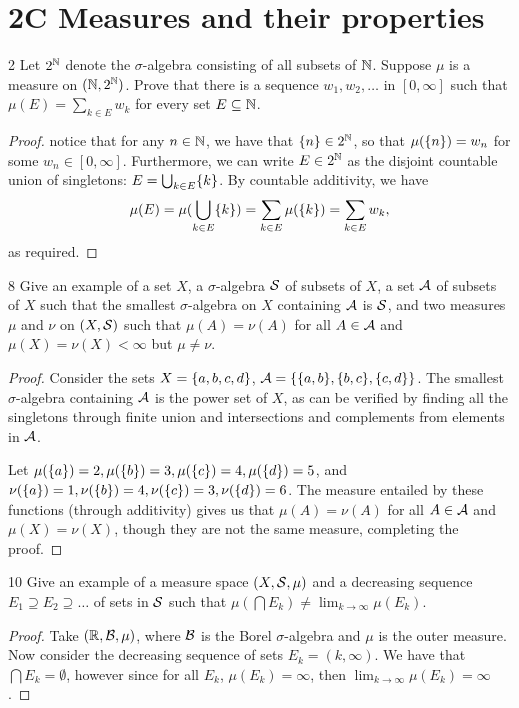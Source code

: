\section{2C Measures and their properties}


\begin{exercise}{2}
Let $2^{\mathbb{N}}$ denote the $\sigma$-algebra consisting of all subsets of $\mathbb{N}$.
Suppose $\mu$ is a measure on $(\mathbb{N}, 2^{\mathbb{N}})$.
Prove that there is a sequence $w_1,w_2,\dots$ in $[0,\infty]$ such that $\mu(E) = \sum_{k\in E} w_k$ for every set $E \subseteq \mathbb{N}$.
\end{exercise}
\begin{proof}
notice that for any $n\in\mathbb{N}$, we have that $\{n\} \in 2^{\mathbb{N}}$, so that $\mu(\{n\}) = w_n$ for some $w_n \in [0,\infty]$.
Furthermore, we can write $E \in 2^{\mathbb{N}}$ as the disjoint countable union of singletons: $E = \bigcup_{k \in E} \{k\}$.
By countable additivity, we have 
\begin{align*}
    \mu(E) 
    = \mu( \bigcup_{k\in E} \{k\}) 
    = \sum_{k \in E} \mu(\{k\}) 
    = \sum_{k \in E} w_k,
\end{align*}
as required.
\end{proof} 

\begin{exercise}{8}
Give an example of a set $X$, a $\sigma$-algebra $\mathcal{S}$ of subsets of $X$, a set $\mathcal{A}$ of subsets of $X$ such that the smallest $\sigma$-algebra on $X$ containing $\mathcal{A}$ is $\mathcal{S}$, and two measures $\mu$ and $\nu$ on $(X,\mathcal{S})$ such that $\mu(A) = \nu(A)$ for all $A \in \mathcal{A}$ and $\mu(X) = \nu(X) < \infty$ but $\mu \neq \nu$.
\end{exercise}
\begin{proof}
Consider the sets $X = \{a,b,c,d\}$, $\mathcal{A} = \{\{a,b\}, \{b,c\}, \{c,d\}\}$.
The smallest $\sigma$-algebra containing $\mathcal{A}$ is the power set of $X$, as can be verified by finding all the singletons through finite union and intersections and complements from elements in $\mathcal{A}$.

Let $\mu(\{a\}) = 2, \mu(\{b\}) = 3, \mu(\{c\}) = 4, \mu(\{d\}) = 5$, and $\nu(\{a\}) = 1, \nu(\{b\}) = 4, \nu(\{c\}) = 3, \nu(\{d\}) = 6$.
The measure entailed by these functions (through additivity) gives us that $\mu(A) = \nu(A)$  for all $A \in \mathcal{A}$ and $\mu(X) = \nu(X)$, though they are not the same measure, completing the proof.
\end{proof} 

\begin{exercise}{10}
Give an example of a measure space $(X, \mathcal{S}, \mu)$ and a decreasing sequence $E_1 \supseteq E_2 \supseteq \dots$ of sets in $\mathcal{S}$ such that $\mu( \bigcap E_k) \neq \lim_{k\to\infty} \mu(E_k)$.
\end{exercise}
\begin{proof}
Take $(\mathbb{R}, \mathcal{B}, \mu)$, where $\mathcal{B}$ is the Borel $\sigma$-algebra and $\mu$ is the outer measure.
Now consider the decreasing sequence of sets $E_k = (k,\infty)$.
We have that $\bigcap E_k = \emptyset$, however since for all $E_k$, $\mu(E_k) = \infty$, then $\lim_{k\to \infty} \mu(E_k) = \infty$.
\end{proof} 

